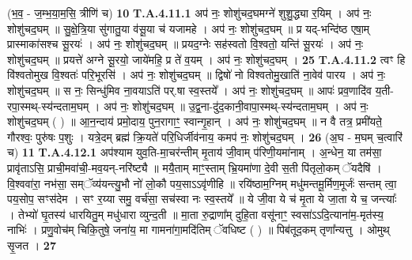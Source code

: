 \documentclass[17pt]{extarticle}
\begin{document}
                  \newline
                                                        (भ॒व॒ - ज॒म्भ॒या॒म॒सि॒ त्रीणि॑ च) \textbf{10} \newline \newline
                                \textbf{ T.A.4.11.1} \newline
                  अप॑ नः॒ शोशु॑चद॒घमग्ने॑ शुशु॒द्ध्या र॒यिम् । अप॑ नः॒ शोशु॑चद॒घम् ॥ सु॒क्षे॒त्रि॒या सु॑गातु॒या व॑सू॒या च॑ यजामहे । अप॑ नः॒ शोशु॑चद॒घम् ॥  प्र यद्-भन्दि॑ष्ठ एषा॒म् प्रास्माका॑सश्च सू॒रयः॑ । अप॑ नः॒ शोशु॑चद॒घम् ॥ प्रयद॒ग्नेः सह॑स्वतो वि॒श्वतो॒ यन्ति॑ सू॒रयः॑ । अप॑ नः॒ शोशु॑चद॒घम् ॥  प्रयत्ते॑ अग्ने सू॒रयो॒ जाये॑महि॒ प्र ते॑ व॒यम् ।  अप॑ नः॒ शोशु॑चद॒घम् । \textbf{ 25} \newline
                  \newline
                                                                  \textbf{ T.A.4.11.2} \newline
                  त्वꣳ हि वि॑श्वतोमुख वि॒श्वतः॑ परि॒भूरसि॑ । अप॑ नः॒ शोशु॑चद॒घम् ॥ द्विषो॑ नो विश्वतोमु॒खाति॑ ना॒वेव॑ पारय । अप॑ नः॒ शोशु॑चद॒घम् ॥ स नः॒ सिन्धु॑मिव ना॒वयाऽति॑ पर्.षा स्व॒स्तये᳚ । अप॑ नः॒ शोशु॑चद॒घम् ॥ आपः॑ प्रव॒णादि॑व य॒ती-रपा॒स्मथ्-स्य॑न्दताम॒घम् । अप॑ नः॒ शोशु॑चद॒घम् ॥ उ॒द्व॒ना-दु॑द॒कानी॒वापा॒स्मथ्-स्य॑न्दताम॒घम् ।  अप॑ नः॒ शोशु॑चद॒घम् ( ) ॥ आ॒न॒न्दाय॑ प्रमो॒दाय॒ पुन॒रागाꣳ॒॒ स्वान्गृ॒हान् । अप॑ नः॒ शोशु॑चद॒घम् ॥ न वै तत्र॒ प्रमी॑यते॒ गौरश्वः॒ पुरु॑षः प॒शुः ।  यत्रे॒दम् ब्रह्म॑ क्रि॒यते॑ परि॒धिर्जीव॑नाय॒ कमप॑ नः॒ शोशु॑चद॒घम् । \textbf{ 26} \newline
                  \newline
                                                        (अ॒घ - म॒घम् च॒त्वारि॑ च) \textbf{11} \newline \newline
                                \textbf{ T.A.4.12.1} \newline
                  अप॑श्याम युव॒ति-मा॒चर॑न्तीम् मृ॒ताय॑ जी॒वाम् प॑रिणी॒यमा॑नाम् । अ॒न्धेन॒ या तम॑सा॒ प्रावृ॑ताऽसि॒ प्राची॒मवा॑ची॒-मव॒यन्-नरि॑ष्ट्यै ॥  मयै॒ताम् माꣳ॒॒स्ताम् भ्रि॒यमा॑णा दे॒वी स॒ती पि॑तृलो॒कम् ॅयदैषि॑ । वि॒श्ववा॑रा॒ नभ॑सा॒ सम्ॅव्य॑यन्त्यु॒भौ नो॑ लो॒कौ पय॒साऽऽवृ॑णीहि ॥  रयि॑ष्ठाम॒ग्निम् मधु॑मन्तमू॒र्मिण॒मूर्जः॑ सन्तम् त्वा॒ पय॒सोप॒ सꣳस॑देम ।  सꣳ र॒य्या समु॒ वर्च॑सा॒ सच॑स्वा नः स्व॒स्तये᳚ ॥  ये जी॒वा ये च॑ मृ॒ता ये जा॒ता ये च॒ जन्त्याः᳚ ।  तेभ्यो॑ घृ॒तस्य॑ धारयितु॒म् मधु॑धारा व्युन्द॒ती ॥  मा॒ता रु॒द्राणा᳚म् दुहि॒ता वसू॑नाꣳ॒॒ स्वसा॑ऽऽदि॒त्याना॑म॒-मृत॑स्य॒ नाभिः॑ ।  प्रणु॒वोच॑म् चिकि॒तुषे॒ जना॑य॒ मा गामना॑गा॒मदि॑तिम् ॅवधिष्ट ( ) ॥ पिब॑तूद॒कम् तृणा᳚न्यत्तु । ओमुथ् सृ॒जत । \textbf{ 27} \newline
\end{document}
